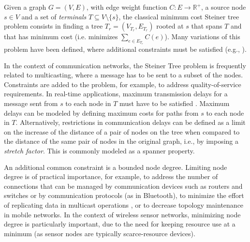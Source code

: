\acresetall
Given a graph $G=(V,E)$, 
with edge weight function $C : E \to \mathbb{R}^+$,
a source node $s \in V$ and a set of \emph{terminals} $T \subseteq V \setminus \lbrace s \rbrace$, the classical minimum cost Steiner tree problem consists in finding 
a tree $T_r = (V_{T_r},E_{T_r})$ rooted at $s$ that spans $T$ and that has minimum cost (i.e. minimizes $\sum_{e \in E_{T_r}} C(e)$). 
Many variations of this problem have been defined, where additional constraints must be satisfied (e.g., \cite{Oliveira2005,Parsa1998,Wang2009}).

In the context of communication networks, the Steiner Tree problem is frequently related to multicasting, where a message has to be sent to
a subset of the nodes. %
Constraints are added to the problem, for example, to address quality-of-service requirements.
In real-time applications, maximum transmission delays for a message sent from $s$ to each node in $T$ must have to be satisfied \cite{Oliveira2005,Nguyen2008}. 
Maximum delays can be modeled by defining maximum costs for paths from $s$ to each node in $T$. 
Alternatively, restrictions in communication delays can be defined as a limit on the increase of the distance of a pair of nodes on the tree when compared 
to the distance of the same pair of nodes in the original graph, i.e., by imposing a \emph{stretch factor}. This is commonly modeled as a 
spanner property.

An additional common constraint is a bounded node degree. Limiting node degree is of practical importance, for example,  
to address the number of connections that can be managed by communication devices such as routers and switches or by communication protocols 
(as in Bluetooth), to minimize the effort of replicating data in multicast operations \cite{Oliveira2005,Nguyen2008}, or to
decrease topology maintenance in mobile networks. In the context of wireless sensor networks, minimizing node degree is particularly important, due to 
the need for keeping resource use at
a minimum (as sensor nodes are typically scarce-resource devices).

